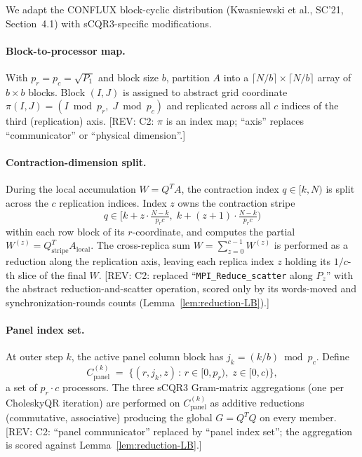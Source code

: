 \documentclass[11pt]{article}
\newcommand{\REV}[1]{\textcolor{blue!60!black}{\small\textsf{[REV: #1]}}}
\begin{document}
We adapt the CONFLUX block-cyclic distribution (Kwasniewski et al.,
SC'21, Section~4.1) with sCQR3-specific modifications.

\paragraph{Block-to-processor map.}
With $p_r = p_c = \sqrt{P_1}$ and block size $b$, partition $A$ into a
$\lceil N/b\rceil \times \lceil N/b\rceil$ array of $b \times b$ blocks.
Block $(I,J)$ is assigned to abstract grid coordinate
$\pi(I,J) = (I \bmod p_r,\; J \bmod p_c)$ and replicated across all $c$
indices of the third (replication) axis. \REV{C2: $\pi$ is an index
map; ``axis'' replaces ``communicator'' or ``physical dimension''.}

\paragraph{Contraction-dimension split.}
During the local accumulation $W = Q^T A$, the contraction index
$q \in [k,N)$ is split across the $c$ replication indices. Index $z$
owns the contraction stripe
\[
  q \in \big[k + z \cdot \tfrac{N-k}{p_r c},\;
              k + (z{+}1) \cdot \tfrac{N-k}{p_r c}\big)
\]
within each row block of its $r$-coordinate, and computes the partial
$W^{(z)} = Q_{\mathrm{stripe}}^T A_{\mathrm{local}}$. The cross-replica
sum $W = \sum_{z=0}^{c-1} W^{(z)}$ is performed as a reduction along
the replication axis, leaving each replica index $z$ holding its
$1/c$-th slice of the final $W$. \REV{C2: replaced
``\texttt{MPI\_Reduce\_scatter} along $P_z$'' with the abstract
reduction-and-scatter operation, scored only by its words-moved and
synchronization-rounds counts (Lemma~\ref{lem:reduction-LB}).}

\paragraph{Panel index set.}
At outer step $k$, the active panel column block has
$j_k = (k/b) \bmod p_c$. Define
\[
  C^{(k)}_{\mathrm{panel}}
    \;=\; \{(r,j_k,z)\,:\, r \in [0,p_r),\; z \in [0,c)\},
\]
a set of $p_r \cdot c$ processors. The three sCQR3 Gram-matrix
aggregations (one per CholeskyQR iteration) are performed on
$C^{(k)}_{\mathrm{panel}}$ as additive reductions (commutative,
associative) producing the global $G = Q^T Q$ on every member.
\REV{C2: ``panel communicator'' replaced by ``panel index set''; the
aggregation is scored against Lemma~\ref{lem:reduction-LB}.}
\end{document}
